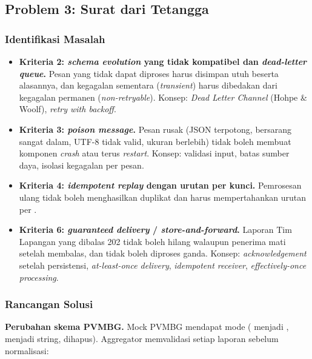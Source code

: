 \subsection{Problem 3: Surat dari Tetangga}

\subsubsection{Identifikasi Masalah}
\begin{itemize}
\item \textbf{Kriteria 2: \textit{schema evolution} yang tidak kompatibel dan \textit{dead-letter queue}.} Pesan yang tidak dapat diproses harus disimpan utuh beserta alasannya, dan kegagalan sementara (\textit{transient}) harus dibedakan dari kegagalan permanen (\textit{non-retryable}). Konsep: \textit{Dead Letter Channel} (Hohpe \& Woolf), \textit{retry with backoff}.
\item \textbf{Kriteria 3: \textit{poison message}.} Pesan rusak (JSON terpotong, bersarang sangat dalam, UTF-8 tidak valid, ukuran berlebih) tidak boleh membuat komponen \textit{crash} atau terus \textit{restart}. Konsep: validasi input, batas sumber daya, isolasi kegagalan per pesan.
\item \textbf{Kriteria 4: \textit{idempotent replay} dengan urutan per kunci.} Pemrosesan ulang tidak boleh menghasilkan duplikat dan harus mempertahankan urutan per .
\item \textbf{Kriteria 6: \textit{guaranteed delivery} / \textit{store-and-forward}.} Laporan Tim Lapangan yang dibalas 202 tidak boleh hilang walaupun penerima mati setelah membalas, dan tidak boleh diproses ganda. Konsep: \textit{acknowledgement} setelah persistensi, \textit{at-least-once delivery}, \textit{idempotent receiver}, \textit{effectively-once processing}.
\end{itemize}

\subsubsection{Rancangan Solusi}

\textbf{Perubahan skema PVMBG.} Mock PVMBG mendapat mode  ( menjadi ,  menjadi string,  dihapus). Aggregator memvalidasi setiap laporan sebelum normalisasi:

